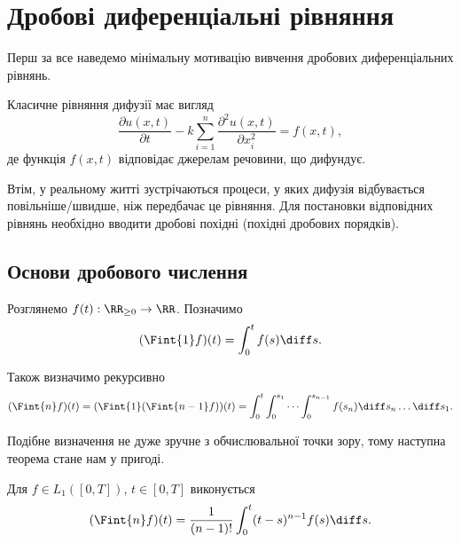 \section{Дробові диференціальні рівняння}

Перш за все наведемо мінімальну мотивацію вивчення дробових диференціальних рівнянь.

\begin{reminder}
    Класичне рівняння дифузії має вигляд
    \begin{equation}
        \frac{\partial u(x, t)}{\partial t} - k \sum_{i = 1}^n \frac{\partial^2 u(x, t)}{\partial x_i^2} = f(x, t),
    \end{equation}
    де функція $f(x, t)$ відповідає джерелам речовини, що дифундує.
\end{reminder}

Втім, у реальному житті зустрічаються процеси, у яких дифузія відбувається повільніше/шви\-дше, ніж передбачає це рівняння. Для постановки відповідних рівнянь необхідно вводити дробові похідні (похідні дробових порядків).

\subsection{Основи дробового числення}

Розглянемо $f(t): \RR_{\ge 0} \to \RR$. Позначимо
\begin{equation}
    (\Fint{1} f)(t) = \int_0^t f(s) \diff s.
\end{equation}

Також визначимо рекурсивно
\begin{equation}
    ( \Fint{n} f ) (t) = ( \Fint{1} ( \Fint{n - 1} f ) ) (t) = \int_0^t \int_0^{s_1} \cdots \int_0^{s_{n - 1}} f(s_n) \diff s_n \ldots \diff s_1.
\end{equation}

Подібне визначення не дуже зручне з обчислювальної точки зору, тому наступна теорема стане нам у пригоді.

\begin{th_formula}
    Для $f \in L_1([0, T])$, $t \in [0, T]$ виконується
    \begin{equation}
        ( \Fint{n} f ) (t) = \frac{1}{(n - 1)!} \int_0^t (t - s)^{n - 1} f(s) \diff s.
    \end{equation}
\end{th_formula}

